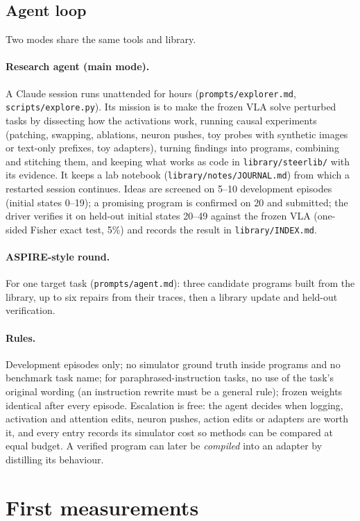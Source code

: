 \documentclass[11pt]{article}
\begin{document}
\subsection{Agent loop}
Two modes share the same tools and library.
\paragraph{Research agent (main mode).} A Claude session runs unattended for hours (\texttt{prompts/explorer.md},
\texttt{scripts/explore.py}). Its mission is to make the frozen VLA solve perturbed tasks by dissecting how the activations work,
running causal experiments (patching, swapping, ablations, neuron pushes, toy probes with synthetic images or text-only prefixes,
toy adapters), turning findings into programs, combining and stitching them, and keeping what works as code in
\texttt{library/steerlib/} with its evidence. It keeps a lab notebook (\texttt{library/notes/JOURNAL.md}) from which a restarted
session continues. Ideas are screened on 5--10 development episodes (initial states 0--19); a promising program is confirmed on 20
and submitted; the driver verifies it on held-out initial states 20--49 against the frozen VLA (one-sided Fisher exact test, 5\%)
and records the result in \texttt{library/INDEX.md}.

\paragraph{ASPIRE-style round.} For one target task (\texttt{prompts/agent.md}): three candidate programs built from the library,
up to six repairs from their traces, then a library update and held-out verification.

\paragraph{Rules.} Development episodes only; no simulator ground truth inside programs and no benchmark task name; for
paraphrased-instruction tasks, no use of the task's original wording (an instruction rewrite must be a general rule); frozen
weights identical after every episode. Escalation is free: the agent decides when logging, activation and attention edits,
neuron pushes, action edits or adapters are worth it, and every entry records its simulator cost so methods can be compared at
equal budget. A verified program can later be \emph{compiled} into an adapter by distilling its behaviour.

\section{First measurements}\label{sec:results}

\end{document}
